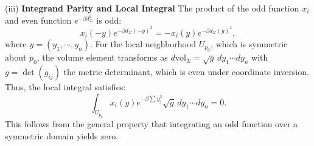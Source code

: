 \documentclass[a4, 12pt]{amsart}
\numberwithin{equation}{section} \numberwithin{equation}{section}
\begin{document}
(iii) \textbf{Integrand Parity and Local Integral}
The product of the odd function $x_i$ and even function $e^{-\beta d_{\Sigma}^2}$ is odd:
\begin{equation*}
x_i(-y) e^{-\beta d_{\Sigma}(-y)^2} = -x_i(y) e^{-\beta d_{\Sigma}(y)^2},
\end{equation*}
where $y = (y_1, \cdots, y_n)$. For the local neighborhood $U_{p_0}$, which is symmetric about $p_0$, the volume element transforms as $d\mathrm{vol}_{\Sigma} = \sqrt{g} \, dy_1 \cdots dy_n$ with $g = \det(g_{ij})$ the metric determinant, which is even under coordinate inversion. Thus, the local integral satisfies:
\begin{equation}\label{eq:local-integral}
\int_{U_{p_0}} x_i(y) e^{-\beta \sum y_j^2} \sqrt{g} \, dy_1 \cdots dy_n = 0.
\end{equation}
This follows from the general property that integrating an odd function over a symmetric domain yields zero.
\end{document}
